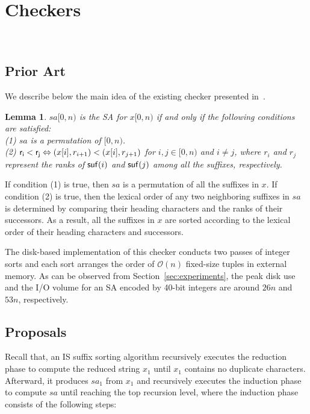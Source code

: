 \documentclass[10pt,journal,compsoc]{IEEEtran}
\newtheorem{lemma}[theorem]{Lemma}
\begin{document}
\section{Checkers}~\label{sec:checkers}

\subsection{Prior Art} \label{sec:checkers:prior_art}

We describe below the main idea of the existing checker presented in~\cite{Dementiev2008a}.

\begin{lemma} \label{lemma:1}
	$sa[0, n)$ is the SA for $x[0, n)$ if and only if the following conditions are satisfied:\\
	(1) $sa$ is a permutation of $[0, n)$. \\	
	(2) ${\sf r_i < r_j} \Leftrightarrow (x[i], r_{i + 1}) < (x[i], r_{j + 1})$ for $ i, j \in [0, n)$ and $i\ne j$, where $r_i$ and $r_j$ represent the ranks of ${\sf suf}(i)$ and ${\sf suf}(j)$ among all the suffixes, respectively. \\
\end{lemma}

\begin{IEEEproof} If condition (1) is true, then $sa$ is a permutation of all the suffixes in $x$. If condition (2) is true, then the lexical order of any two neighboring suffixes in $sa$ is determined by comparing their heading characters and the ranks of their successors. As a result, all the suffixes in $x$ are sorted according to the lexical order of their heading characters and successors. 

\end{IEEEproof}

The disk-based implementation of this checker conducts two passes of integer sorts and each sort arranges the order of $\mathcal{O}(n)$ fixed-size tuples in external memory. As can be observed from Section~\ref{sec:experiments}, the peak disk use and the I/O volume for an SA encoded by 40-bit integers are around $26n$ and $53n$, respectively.

\subsection{Proposals} \label{sec:checkers:proposals}

Recall that, an IS suffix sorting algorithm recursively executes the reduction phase to compute the reduced string $x_1$ until $x_1$ contains no duplicate characters. Afterward, it produces $sa_1$ from $x_1$ and recursively executes the induction phase to compute $sa$ until reaching the top recursion level, where the induction phase consists of the following steps:
\end{document}

